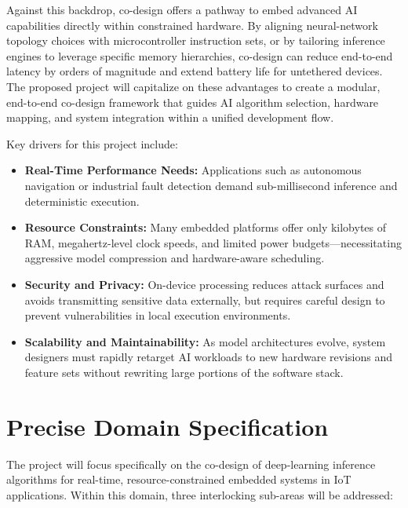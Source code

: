 Against this backdrop, co-design offers a pathway to embed advanced AI capabilities directly within constrained hardware. By aligning neural-network topology choices with microcontroller instruction sets, or by tailoring inference engines to leverage specific memory hierarchies, co-design can reduce end-to-end latency by orders of magnitude and extend battery life for untethered devices. The proposed project will capitalize on these advantages to create a modular, end-to-end co-design framework that guides AI algorithm selection, hardware mapping, and system integration within a unified development flow.

Key drivers for this project include:

\begin{itemize}
    \item \textbf{Real-Time Performance Needs:} Applications such as autonomous navigation or industrial fault detection demand sub-millisecond inference and deterministic execution.
    \item \textbf{Resource Constraints:} Many embedded platforms offer only kilobytes of RAM, megahertz-level clock speeds, and limited power budgets—necessitating aggressive model compression and hardware-aware scheduling.
    \item \textbf{Security and Privacy:} On-device processing reduces attack surfaces and avoids transmitting sensitive data externally, but requires careful design to prevent vulnerabilities in local execution environments.
    \item \textbf{Scalability and Maintainability:} As model architectures evolve, system designers must rapidly retarget AI workloads to new hardware revisions and feature sets without rewriting large portions of the software stack.
\end{itemize}

\section{Precise Domain Specification}

The project will focus specifically on the co-design of deep-learning inference algorithms for real-time, resource-constrained embedded systems in IoT applications. Within this domain, three interlocking sub-areas will be addressed:

